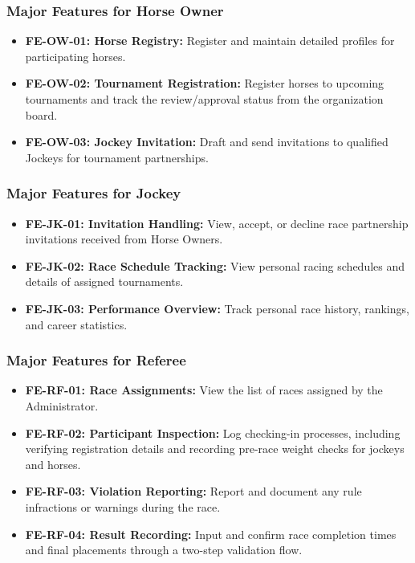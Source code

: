 \subsubsection{Major Features for Horse Owner}
\begin{itemize}
    \item \textbf{FE-OW-01: Horse Registry:} Register and maintain detailed profiles for participating horses.
    \item \textbf{FE-OW-02: Tournament Registration:} Register horses to upcoming tournaments and track the review/approval status from the organization board.
    \item \textbf{FE-OW-03: Jockey Invitation:} Draft and send invitations to qualified Jockeys for tournament partnerships.
\end{itemize}

\subsubsection{Major Features for Jockey}
\begin{itemize}
    \item \textbf{FE-JK-01: Invitation Handling:} View, accept, or decline race partnership invitations received from Horse Owners.
    \item \textbf{FE-JK-02: Race Schedule Tracking:} View personal racing schedules and details of assigned tournaments.
    \item \textbf{FE-JK-03: Performance Overview:} Track personal race history, rankings, and career statistics.
\end{itemize}

\subsubsection{Major Features for Referee}
\begin{itemize}
    \item \textbf{FE-RF-01: Race Assignments:} View the list of races assigned by the Administrator.
    \item \textbf{FE-RF-02: Participant Inspection:} Log checking-in processes, including verifying registration details and recording pre-race weight checks for jockeys and horses.
    \item \textbf{FE-RF-03: Violation Reporting:} Report and document any rule infractions or warnings during the race.
    \item \textbf{FE-RF-04: Result Recording:} Input and confirm race completion times and final placements through a two-step validation flow.
\end{itemize}

